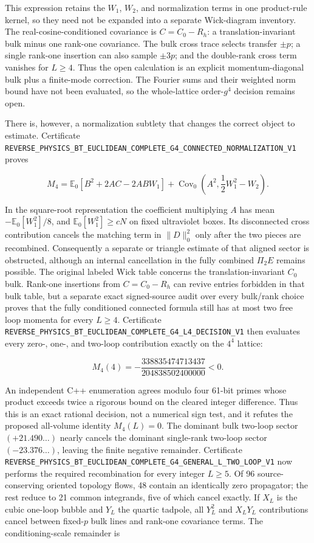 \documentclass[11pt]{article}
\theoremstyle{definition}
\theoremstyle{remark}
\newcommand{\cert}[1]{\nolinkurl{#1}}
\begin{document}
This expression retains the $W_1$, $W_2$, and normalization terms in one
product-rule kernel, so they need not be expanded into a separate Wick-diagram
inventory.  The real-cosine-conditioned covariance is
$C=C_0-R_h$: a translation-invariant bulk minus one rank-one covariance.
The bulk cross trace selects transfer $\pm p$; a single rank-one insertion can
also sample $\pm3p$; and the double-rank cross term vanishes for $L\geq4$.
Thus the open calculation is an explicit momentum-diagonal bulk plus a
finite-mode correction.  The Fourier sums and their weighted norm bound have
not been evaluated, so the whole-lattice order-$g^4$ decision remains open.

There is, however, a normalization subtlety that changes the correct object
to estimate.  Certificate
\cert{REVERSE_PHYSICS_BT_EUCLIDEAN_COMPLETE_G4_CONNECTED_NORMALIZATION_V1}
proves

\[
 M_4=\mathbb E_0[B^2+2AC-2ABW_1]
     +\operatorname{Cov}_0\!\left(A^2,\frac12W_1^2-W_2\right).
\]

In the square-root representation the coefficient multiplying \(A\) has
mean \(-\mathbb E_0[W_1^2]/8\), and
\(\mathbb E_0[W_1^2]\geq cN\) on fixed ultraviolet boxes.  Its disconnected
cross contribution cancels the matching term in \(\|D\|_0^2\) only after the
two pieces are recombined.  Consequently a separate or triangle estimate of
that aligned sector is obstructed, although an internal cancellation in the
fully combined \(\Pi_2E\) remains possible.  The original labeled Wick table
concerns the translation-invariant \(C_0\) bulk.  Rank-one insertions from
\(C=C_0-R_h\) can revive entries forbidden in that bulk table, but a separate
exact signed-source audit over every bulk/rank choice proves that the fully
conditioned connected formula still has at most two free loop momenta for
every \(L\geq4\).  Certificate
\cert{REVERSE_PHYSICS_BT_EUCLIDEAN_COMPLETE_G4_L4_DECISION_V1} then evaluates
every zero-, one-, and two-loop contribution exactly on the \(4^4\) lattice:

\[
 M_4(4)=-\frac{338835474713437}{204838502400000}<0.
\]

An independent C++ enumeration agrees modulo four 61-bit primes whose product
exceeds twice a rigorous bound on the cleared integer difference.  Thus this
is an exact rational decision, not a numerical sign test, and it refutes the
proposed all-volume identity \(M_4(L)=0\).  The dominant bulk two-loop sector
\((+21.490\ldots)\) nearly cancels the dominant single-rank two-loop sector
\((-23.376\ldots)\), leaving the finite negative remainder.  Certificate
\cert{REVERSE_PHYSICS_BT_EUCLIDEAN_COMPLETE_G4_GENERAL_L_TWO_LOOP_V1}
now performs the required recombination for every integer \(L\geq5\).  Of 96
source-conserving oriented topology flows, 48 contain an identically zero
propagator; the rest reduce to 21 common integrands, five of which cancel
exactly.  If
\(X_L\) is the cubic one-loop bubble and \(Y_L\) the quartic tadpole, all
\(Y_L^2\) and \(X_LY_L\) contributions cancel between fixed-\(p\) bulk lines
and rank-one covariance terms.  The conditioning-scale remainder is
\end{document}
